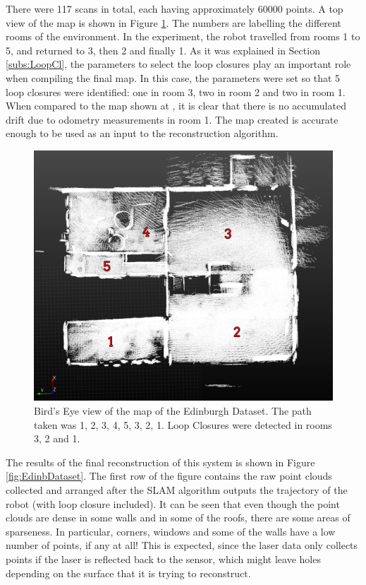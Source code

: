 \documentclass[11pt]{article}
\begin{document}
There were 117 scans in total, each having approximately 60000 points. A top view of the map is shown in Figure \ref{fig:TopViewEdinDataset}. The numbers are labelling the different rooms of the environment. In the experiment, the robot travelled from rooms 1 to 5, and returned to 3, then 2 and finally 1. As it was explained in Section \ref{subs:LoopCl}, the parameters to select the loop closures play an important role when compiling the final map. In this case, the parameters were set so that 5 loop closures were identified: one in room 3, two in room 2 and two in room 1. When compared to the map shown at \cite{AICPAlign}, it is clear that there is no accumulated drift due to odometry measurements in room 1. The map created is accurate enough to be used as an input to the reconstruction algorithm.
	
\begin{figure}
\centering
\includegraphics[width=0.8\linewidth]{Maps1/TopViewMarked}
\caption{Bird's Eye view of the map of the Edinburgh Dataset. The path taken was 1, 2, 3, 4, 5, 3, 2, 1. Loop Closures were detected in rooms 3, 2 and 1.}
\label{fig:TopViewEdinDataset}
\end{figure}
	
The results of the final reconstruction of this system is shown in Figure \ref{fig:EdinbDataset}. The first row of the figure contains the raw point clouds collected and arranged after the SLAM algorithm outputs the trajectory of the robot (with loop closure included). It can be seen that even though the point clouds are dense in some walls and in some of the roofs, there are some areas of sparseness. In particular, corners, windows and some of the walls have a low number of points, if any at all! This is expected, since the laser data only collects points if the laser is reflected back to the sensor, which might leave holes depending on the surface that it is trying to reconstruct.
	
\end{document}
